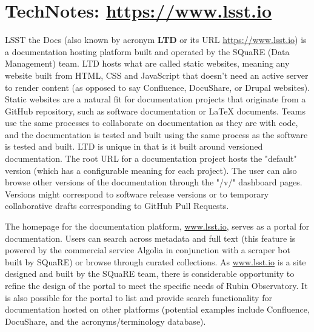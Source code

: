 \newpage
\section{TechNotes: \url{https://www.lsst.io}}

LSST the Docs (also known by acronym {\bf LTD} or its URL \url{https://www.lsst.io}) is a documentation hosting platform built and operated by the SQuaRE (Data Management) team. LTD hosts what are called static websites, meaning any website built from HTML, CSS and JavaScript that doesn't need an active server to render content (as opposed to say Confluence, DocuShare, or Drupal websites). Static websites are a natural fit for documentation projects that originate from a GitHub repository, such as software documentation or LaTeX documents. Teams use the same processes to collaborate on documentation as they are with code, and the documentation is tested and built using the same process as the software is tested and built. LTD is unique in that is it built around versioned documentation. The root URL for a documentation project hosts the "default" version (which has a configurable meaning for each project). The user can also browse other versions of the documentation through the "/v/" dashboard pages. Versions might correspond to software release versions or to temporary collaborative drafts corresponding to GitHub Pull Requests.

The homepage for the documentation platform, \url{www.lsst.io}, serves as a portal for documentation. Users can search across metadata and full text (this feature is powered by the commercial service Algolia in conjunction with a scraper bot built by SQuaRE) or browse through curated collections. As \url{www.lsst.io} is a site designed and built by the SQuaRE team, there is considerable opportunity to refine the design of the portal to meet the specific needs of Rubin Observatory. It is also possible for the portal to list and provide search functionality for documentation hosted on other platforms (potential examples include Confluence, DocuShare, and the acronyms/terminology database).

